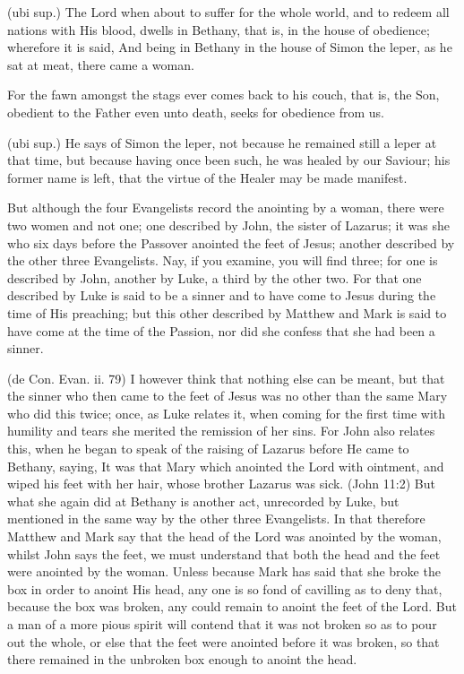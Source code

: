  (ubi sup.) The Lord when about to suffer for the whole world, and to redeem all nations with His blood, dwells in Bethany, that is, in the house of obedience; wherefore it is said, And being in Bethany in the house of Simon the leper, as he sat at meat, there came a woman.

 For the fawn amongst the stags ever comes back to his couch, that is, the Son, obedient to the Father even unto death, seeks for obedience from us.

 (ubi sup.) He says of Simon the leper, not because he remained still a leper at that time, but because having once been such, he was healed by our Saviour; his former name is left, that the virtue of the Healer may be made manifest.

 But although the four Evangelists record the anointing by a woman, there were two women and not one; one described by John, the sister of Lazarus; it was she who six days before the Passover anointed the feet of Jesus; another described by the other three Evangelists. Nay, if you examine, you will find three; for one is described by John, another by Luke, a third by the other two. For that one described by Luke is said to be a sinner and to have come to Jesus during the time of His preaching; but this other described by Matthew and Mark is said to have come at the time of the Passion, nor did she confess that she had been a sinner.

 (de Con. Evan. ii. 79) I however think that nothing else can be meant, but that the sinner who then came to the feet of Jesus was no other than the same Mary who did this twice; once, as Luke relates it, when coming for the first time with humility and tears she merited the remission of her sins. For John also relates this, when he began to speak of the raising of Lazarus before He came to Bethany, saying, It was that Mary which anointed the Lord with ointment, and wiped his feet with her hair, whose brother Lazarus was sick. (John 11:2) But what she again did at Bethany is another act, unrecorded by Luke, but mentioned in the same way by the other three Evangelists. In that therefore Matthew and Mark say that the head of the Lord was anointed by the woman, whilst John says the feet, we must understand that both the head and the feet were anointed by the woman. Unless because Mark has said that she broke the box in order to anoint His head, any one is so fond of cavilling as to deny that, because the box was broken, any could remain to anoint the feet of the Lord. But a man of a more pious spirit will contend that it was not broken so as to pour out the whole, or else that the feet were anointed before it was broken, so that there remained in the unbroken box enough to anoint the head.

